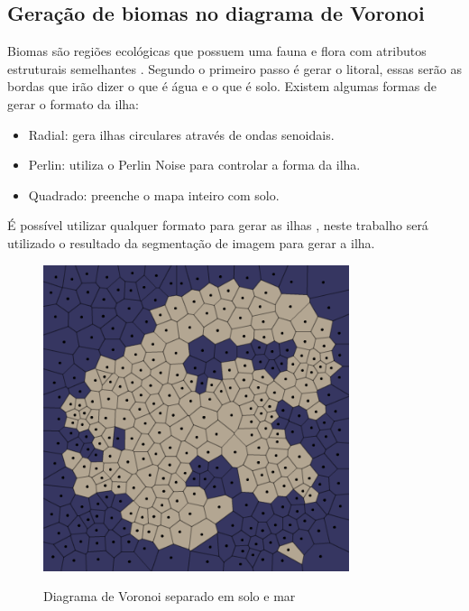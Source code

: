 \subsection{Geração de biomas no diagrama de Voronoi}

Biomas são regiões ecológicas que possuem uma fauna e flora com atributos estruturais semelhantes \cite{maestrovirtuale}. Segundo  o primeiro passo é gerar o litoral, essas serão as bordas que irão dizer o que é água e o que é solo. Existem algumas formas de gerar o formato da ilha:

\begin{itemize}
    \item Radial: gera ilhas circulares através de ondas senoidais.
    \item Perlin: utiliza o Perlin Noise para controlar a forma da ilha.
    \item Quadrado: preenche o mapa inteiro com solo.
\end{itemize}

É possível utilizar qualquer formato para gerar as ilhas \cite{amitp2010}, neste trabalho será utilizado o resultado da segmentação de imagem para gerar a ilha.

\begin{figure}[H]
	\caption{Diagrama de Voronoi separado em solo e mar}
	\centering %
	\includegraphics[width=0.8\textwidth]{figures/voronoi-land-water.png} %
	\label{fig:voronoi-land-water}
\end{figure}

